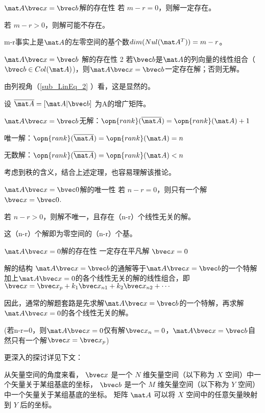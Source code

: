 \begin{theorem}{$\mat A \bvec x=\bvec b$解的存在性}
若 $m-r=0$，则解一定存在。

若 $m-r>0$，则解可能不存在。
\end{theorem}
m-r事实上是$\mat A$的左零空间的基个数$dim(Nul(\mat A^T))=m-r$。

\begin{theorem}{$\mat A \bvec x=\bvec b$ 解的存在性 2}
若$\bvec b$是$\mat A$的列向量的线性组合（$\bvec b \in Col(\mat A)$)，则$\mat A \bvec x=\bvec b$一定存在解；否则无解。
\end{theorem}
由列视角（\autoref{sub_LinEq_2} ）看，这是显然的。

\begin{corollary}{}
设 $\overline{\mat A} = [\mat A | \bvec b] $ 为A的增广矩阵。

$\mat A \bvec x=\bvec b$无解：$\opn{rank}(\overline{\mat A})=\opn{rank}(\mat A)+1$

唯一解：$\opn{rank}(\overline{\mat A})=\opn{rank}(\mat A)=n$

无数解：$\opn{rank}(\overline{\mat A})=\opn{rank}(\mat A)<n$
\end{corollary}
考虑到秩的含义，结合上述定理，也容易理解该推论。

\begin{theorem}{$\mat A \bvec x=\bvec 0$解的唯一性}
若 $n-r=0$，则只有一个解 $\bvec x = \bvec 0$.

若 $n-r>0$，则解不唯一，且存在（n-r）个线性无关的解。
\end{theorem}
这（n-r）个解即为零空间的（n-r）个基。

\begin{theorem}{$\mat A \bvec x=0$解的存在性}
一定存在平凡解 $\bvec x=0$
\end{theorem}

\begin{theorem}{解的结构}
$\mat A \bvec x=\bvec b$的通解等于$\mat A \bvec x=\bvec b$的一个特解加上$\mat A \bvec x=0$的各个线性无关的解的线性组合，即$\bvec x = \bvec x_p +k_1\bvec x_{n1}+k_2\bvec x_{n2}+\cdots$

因此，通常的解题套路是先求解$\mat A \bvec x=\bvec b$的一个特解，再求解$\mat A \bvec x=0$的各个线性无关的解。

(若n-r=0，则$\mat A \bvec x=0$仅有解$\bvec x_n=0$，$\mat A \bvec x=\bvec b$自然只有一个解$\bvec x = \bvec x_p$)
\end{theorem}

更深入的探讨详见下文：

从矢量空间的角度来看， $\bvec x$ 是一个 $N$ 维矢量空间（以下称为 $X$ 空间）中一个矢量关于某组基底的坐标， $\bvec b$ 是一个 $M$ 维矢量空间（以下称为 $Y$ 空间）中一个矢量关于某组基底的坐标。 矩阵 $\mat A$ 可以将 $X$ 空间中的任意矢量映射到 $Y$ 后的坐标。

